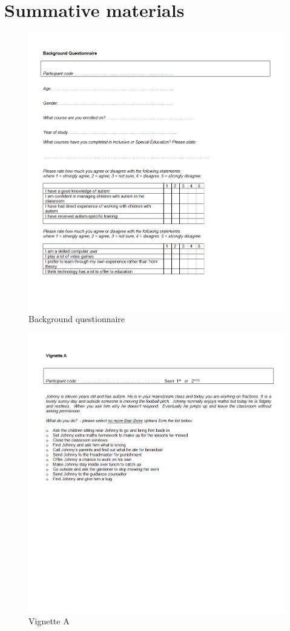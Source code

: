\section{Summative materials}
\label{sec:summative_materials}
\begin{figure}[H]
\centering
\includegraphics[scale=0.7]{images/appendix/background_q.png}
\caption{Background questionnaire}
\label{sum_background}
\end{figure}

\begin{figure}[H]
\centering
\includegraphics[scale=0.7]{images/appendix/summative_va.png}
\caption{Vignette A}
\end{figure}

